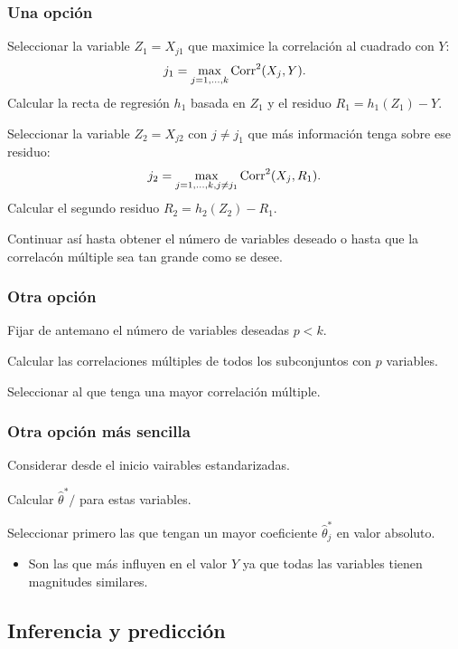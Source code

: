 \subsubsection{Una opción}
Seleccionar la variable $Z_1=X_{j1}$ que maximice la correlación al cuadrado con $Y$:\[ j_1=\max_{j=1,\dots,k}\operatorname{Corr}^2(X_j,Y). \]
Calcular la recta de regresión $h_1$ basada en $Z_1$ y el residuo $R_1=h_1(Z_1)-Y$.

Seleccionar la variable $Z_2=X_{j2}$ con $j\neq j_1$ que más información tenga sobre ese residuo: \[ j_2=\max_{j=1,\dots,k,j\neq j_1}\operatorname{Corr}^2(X_j,R_1). \]
Calcular el segundo residuo $R_2=h_2(Z_2)-R_1$.

Continuar así hasta obtener el número de variables deseado o hasta que la correlacón múltiple sea tan grande como se desee.
\subsubsection{Otra opción}
Fijar de antemano el número de variables deseadas $p<k$.

Calcular las correlaciones múltiples de todos los subconjuntos con $p$ variables.

Seleccionar al que tenga una mayor correlación múltiple.

\subsubsection{Otra opción más sencilla}
Considerar desde el inicio vairables estandarizadas.

Calcular $\hat{\theta}^*/$ para estas variables.

Seleccionar primero las que tengan un mayor coeficiente $\hat{\theta}_j^*$ en valor absoluto.
\begin{itemize}
	\item Son las que más influyen en el valor $Y$ ya que todas las variables tienen magnitudes similares.
\end{itemize}
\subsection{Inferencia y predicción}

